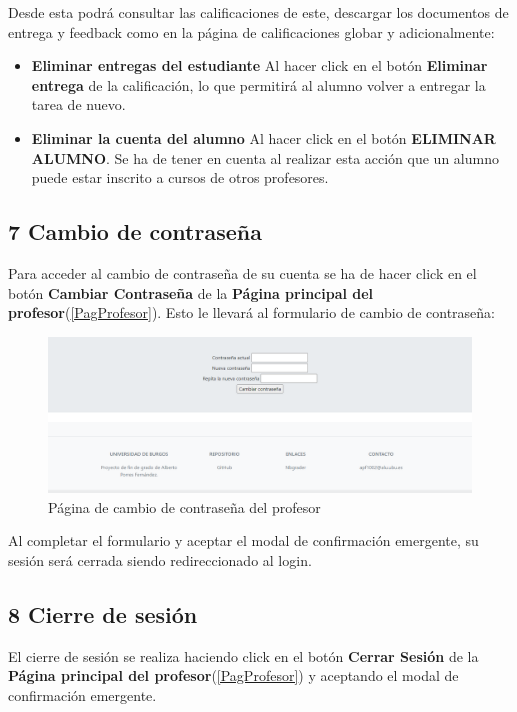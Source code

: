 Desde esta podrá consultar las calificaciones de este, descargar los documentos de entrega y feedback como en la página de calificaciones globar y adicionalmente:

\begin{itemize}
\tightlist
\item \textbf{Eliminar entregas del estudiante} Al hacer click en el botón \textbf{Eliminar entrega} de la calificación, lo que permitirá al alumno volver a entregar la tarea de nuevo.
\item \textbf{Eliminar la cuenta del alumno} Al hacer click en el botón \textbf{ELIMINAR ALUMNO}. Se ha de tener en cuenta al realizar esta acción que un alumno puede estar inscrito a cursos de otros profesores.
\end{itemize}


\subsection{7 Cambio de contraseña}
Para acceder al cambio de contraseña de su cuenta se ha de hacer click en el botón \textbf{Cambiar Contraseña} de la \textbf{Página principal del profesor}(\ref{PagProfesor}). Esto le llevará al formulario de cambio de contraseña:

\begin{figure}[H]
\centering
\includegraphics[width=\textwidth]{img/imgs-memoria/CambiarContra.PNG}
\caption{Página de cambio de contraseña del profesor}
\end{figure}

Al completar el formulario y aceptar el modal de confirmación emergente, su sesión será cerrada siendo redireccionado al login.

\subsection{8 Cierre de sesión} 
El cierre de sesión se realiza haciendo click en el botón \textbf{Cerrar Sesión} de la \textbf{Página principal del profesor}(\ref{PagProfesor}) y aceptando el modal de confirmación emergente.




